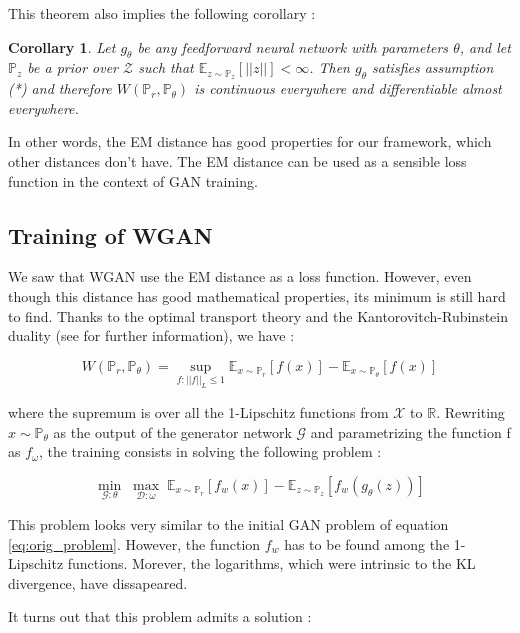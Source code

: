 \documentclass[a4paper]{article}
\newcommand{\G}{\mathcal{G}}
\newcommand{\D}{\mathcal{D}}
\newcommand{\X}{\mathcal{X}}
\newcommand{\Expec}{\mathbb{E}}
\newcommand{\Prob}{\mathbb{P}}
\newcommand{\real}{\mathbb{R}}
\theoremstyle{plain}
\newtheorem{corol}{Corollary}
\theoremstyle{remark}
\theoremstyle{definition}
\begin{document}
This theorem also implies the following corollary :
\begin{corol}
Let $g_\theta$ be any feedforward neural network with parameters $\theta$, and let $\Prob_z$
be a prior over $\mathcal{Z}$ such that $\Expec_{z \sim \Prob_z}[||z||] < \infty$.
Then $g_\theta$ satisfies assumption (*) and therefore $W(\Prob_r , \Prob_\theta)$ is continuous everywhere and differentiable almost everywhere.
\end{corol}

In other words, the EM distance has good properties for our framework, which other distances don't have. The EM distance can be used as a sensible loss function in the context of GAN training.

\subsection{Training of WGAN}

We saw that WGAN use the EM distance as a loss function. However, even though this distance has good mathematical properties, its minimum is still hard to find. Thanks to the optimal transport theory and the Kantorovitch-Rubinstein duality (see \cite{villani2008optimal} for further information), we have :

\begin{equation}
\label{eq:WGANprob}
W(\Prob_r , \Prob_\theta) = \sup_{f : ||f||_L \leqslant 1} \Expec_{x \sim \Prob_r}[f(x)] - \Expec_{x \sim \Prob_\theta} [f(x)]
\end{equation}

 
 where the supremum is over all the 1-Lipschitz functions from $\X$ to $\real$. Rewriting $x \sim \Prob_\theta$ as the output of the generator network $\G$ and parametrizing the function f as $f_\omega$, the training consists in solving the following problem :
 
\begin{equation}
\label{eq:WGAN}
 \min_{\G : \theta} \; \max_{\D : \omega} \; \Expec_{x \sim \Prob_r} [f_w(x)] - \Expec_{z \sim \Prob_z} [f_w(g_\theta(z))]
\end{equation}

This problem looks very similar to the initial GAN problem of equation \ref{eq:orig_problem}. However, the function $f_w$ has to be found among the 1-Lipschitz functions. Morever, the logarithms, which were intrinsic to the KL divergence, have dissapeared.

It turns out that this problem admits a solution :
\end{document}
